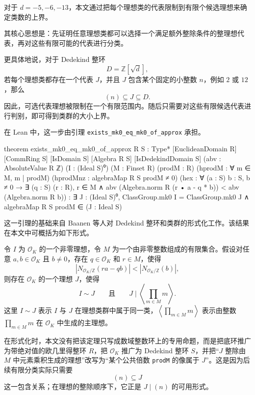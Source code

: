 对于 \(d=-5,-6,-13\)，本文通过把每个理想类的代表限制到有限个候选理想来确定类数的上界。

其核心思想是：先证明任意理想类都可以选择一个满足额外整除条件的整理想代表，再对这些有限可能的代表进行分类。

更具体地说，对于 Dedekind 整环
\[
D=\mathbb Z[\sqrt d],
\]
若每个理想类都存在一个代表 \(J\)，并且 \(J\) 包含某个固定的小整数 \(n\)，例如 \(2\) 或 \(12\)，那么
\[
(n)\subseteq J\subseteq D.
\]
因此，可选代表理想被限制在一个有限范围内。随后只需要对这些有限候选代表进行判别，即可得到类群的大小上界。

在 Lean 中，这一步由引理 \texttt{exists\_mk0\_eq\_mk0\_of\_approx} 承担。
\begin{leanlisting}
theorem exists_mk0_eq_mk0_of_approx
    {R S : Type*} [EuclideanDomain R] [CommRing S] [IsDomain S]
    [Algebra R S] [IsDedekindDomain S]
    (abv : AbsoluteValue R ℤ) (I : (Ideal S)⁰)
    (M : Finset R) (prodM : R)
    (hprodM : ∀ m ∈ M, m | prodM)
    (hprodMnz : algebraMap R S prodM ≠ 0)
    (hex : ∀ (a : S) {b : S}, b ≠ 0 →
      ∃ (q : S) (r : R), r ∈ M ∧
        abv (Algebra.norm R (r • a - q * b)) < abv (Algebra.norm R b)) :
    ∃ J : (Ideal S)⁰,
      ClassGroup.mk0 I = ClassGroup.mk0 J ∧ algebraMap R S prodM ∈ (J : Ideal S)
\end{leanlisting}

这一引理的基础来自 Baanen 等人对 Dedekind 整环和类群的形式化工作\cite{Baanen2021DedekindClassGroups}。该结果在本文中可概括为如下形式。

\begin{theorem}[]\label{thm:classgroup-approx}
令 \(I\) 为 \(\mathcal O_K\) 的一个非零理想，令 \(M\) 为一个由非零整数组成的有限集合。假设对任意 \(a,b\in\mathcal O_K\) 且 \(b\ne0\)，存在 \(q\in\mathcal O_K\) 和 \(r\in M\)，使得
\[
\left|N_{\mathcal O_K/\mathbb Z}(ra-qb)\right|
<
\left|N_{\mathcal O_K/\mathbb Z}(b)\right|,
\]
则存在 \(\mathcal O_K\) 的一个理想 \(J\)，使得
\[
I\sim J
\qquad\text{且}\qquad
J\mid\left\langle \prod_{m\in M}m\right\rangle .
\]
这里 \(I\sim J\) 表示 \(I\) 与 \(J\) 在理想类群中属于同一类，\(\left\langle \prod_{m\in M}m\right\rangle\) 表示由整数 \(\prod_{m\in M}m\) 在 \(\mathcal O_K\) 中生成的主理想。
\end{theorem}

在形式化时，本文没有把该定理只写成数域整数环上的专用命题，而是把底环推广为带绝对值的欧几里得整环 \(R\)，把 \(\mathcal O_K\) 推广为 Dedekind 整环 \(S\)，并把“\(J\) 整除由 \(M\) 中元素乘积生成的理想”改写为“某个公共倍数 \texttt{prodM} 的像属于 \(J\)”。这是因为后续有限分类实际只需要
\[
(n)\subseteq J
\]
这一包含关系；在理想的整除顺序下，它正是 \(J\mid(n)\) 的可用形式。

